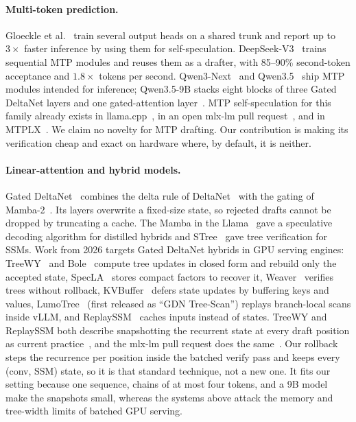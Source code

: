 \paragraph{Multi-token prediction.}
Gloeckle et al.~\cite{gloeckle2024mtp} train several output heads on a shared trunk and report up to $3\times$ faster inference by using them for self-speculation.
DeepSeek-V3~\cite{deepseek2024v3} trains sequential MTP modules and reuses them as a drafter, with 85--90\% second-token acceptance and $1.8\times$ tokens per second.
Qwen3-Next~\cite{qwen2025qwen3next} and Qwen3.5~\cite{qwen2026qwen35} ship MTP modules intended for inference; Qwen3.5-9B stacks eight blocks of three Gated DeltaNet layers and one gated-attention layer~\cite{qiu2025gatedattn}.
MTP self-speculation for this family already exists in llama.cpp~\cite{am17an2026llamacppmtp}, in an open mlx-lm pull request~\cite{airrunner2026mlxlmmtp}, and in MTPLX~\cite{altoukhi2026mtplx}.
We claim no novelty for MTP drafting.
Our contribution is making its verification cheap and exact on hardware where, by default, it is neither.

\paragraph{Linear-attention and hybrid models.}
Gated DeltaNet~\cite{yang2025gdn} combines the delta rule of DeltaNet~\cite{yang2024deltanet} with the gating of Mamba-2~\cite{dao2024mamba2,gu2023mamba}.
Its layers overwrite a fixed-size state, so rejected drafts cannot be dropped by truncating a cache.
The Mamba in the Llama~\cite{wang2024mambainllama} gave a speculative decoding algorithm for distilled hybrids and STree~\cite{wu2025stree} gave tree verification for SSMs.
Work from 2026 targets Gated DeltaNet hybrids in GPU serving engines: TreeWY~\cite{ghantasala2026treewy} and Bole~\cite{wang2026bole} compute tree updates in closed form and rebuild only the accepted state, SpecLA~\cite{wang2026specla} stores compact factors to recover it, Weaver~\cite{oda2026weaver} verifies trees without rollback, KVBuffer~\cite{zou2026kvbuffer} defers state updates by buffering keys and values, LumoTree~\cite{ma2026lumotree} (first released as ``GDN Tree-Scan'') replays branch-local scans inside vLLM, and ReplaySSM~\cite{dao2026replayssm} caches inputs instead of states.
TreeWY and ReplaySSM both describe snapshotting the recurrent state at every draft position as current practice~\cite{ghantasala2026treewy,dao2026replayssm}, and the mlx-lm pull request does the same~\cite{airrunner2026mlxlmmtp}.
Our rollback steps the recurrence per position inside the batched verify pass and keeps every (conv, SSM) state, so it is that standard technique, not a new one.
It fits our setting because one sequence, chains of at most four tokens, and a 9B model make the snapshots small, whereas the systems above attack the memory and tree-width limits of batched GPU serving.

